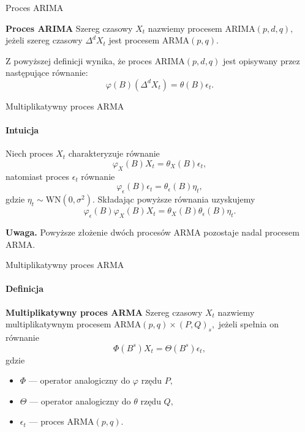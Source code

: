 \documentclass[a4paper, 11pt]{beamer}
\begin{document}
	\begin{frame}{Proces ARIMA}
		\begin{block}{\textbf{Proces ARIMA}}
			Szereg czasowy $X_t$ nazwiemy procesem $\mbox{ARIMA}\left(p, d, q\right),$ jeżeli
			szereg czasowy $\Delta^{d} X_t$ jest procesem $\mbox{ARMA}\left(p, q\right).$
		\end{block}
		Z powyższej definicji wynika, że proces $\mbox{ARIMA}\left(p, d, q\right)$ jest opisywany przez następujące równanie: \[
			\varphi\left(B\right)\left(\Delta^{d} X_{t}\right) = \theta\left(B\right) \epsilon_{t}.
		\]
	\end{frame}
	
	\begin{frame}{Multiplikatywny proces ARMA}
		\framesubtitle{Intuicja}
		Niech proces $X_t$ charakteryzuje równanie \[
			\varphi_X\left(B\right) X_t = \theta_X\left(B\right) \epsilon_t,
		\] natomiast proces $\epsilon_t$ równanie \[
			\varphi_{\epsilon}\left(B\right) \epsilon_t = \theta_{\epsilon}\left(B\right) \eta_t,
		\] gdzie $\eta_t \sim \mbox{WN}\left(0, \sigma^2\right).$
		Składając powyższe równania uzyskujemy \[
			\varphi_{\epsilon}\left(B\right) \varphi_X\left(B\right) X_t = \theta_X\left(B\right) \theta_{\epsilon}\left(B\right) \eta_t.
		\]
		\begin{alert}{\textbf{Uwaga.}}
			Powyższe złożenie dwóch procesów ARMA pozostaje nadal procesem ARMA.
		\end{alert}
	\end{frame}
	
	\begin{frame}{Multiplikatywny proces ARMA}
		\framesubtitle{Definicja}
		\begin{block}{\textbf{Multiplikatywny proces ARMA}}
			Szereg czasowy $X_t$ nazwiemy multiplikatywnym procesem
			$\mbox{ARMA}\left(p, q\right)\times\left(P,Q\right)_s,$ jeżeli
			spełnia on równanie \[
				\Phi\left(B^s\right) X_t = \Theta\left(B^s\right) \epsilon_t,
			\] gdzie
			\begin{itemize}
				\item $\Phi$ --- operator analogiczny do $\varphi$ rzędu $P,$
				\item $\Theta$ --- operator analogiczny do $\theta$ rzędu $Q,$
				\item $\epsilon_t$ --- proces $\mbox{ARMA}\left(p,q\right).$
			\end{itemize}
		\end{block}
	\end{frame}
	
\end{document}
